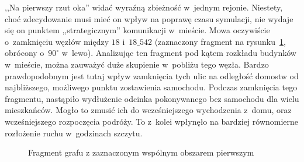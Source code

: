 \documentclass[twoside,12pt]{report}
\begin{document}
,,Na pierwszy rzut oka'' widać wyraźną zbieżność w~jednym rejonie. Niestety, choć zdecydowanie musi mieć on wpływ na poprawę czasu symulacji, nie wydaje się on punktem ,,strategicznym'' komunikacji w~mieście. Mowa oczywiście o~zamknięciu węzłów między $18$ i~$18\_542$ (zaznaczony fragment na rysunku~\ref{fig:frag_1}, obrócony o~$90^{\circ}$ w~lewo). Analizując ten fragment pod kątem rozkładu budynków w~mieście, można zauważyć duże skupienie w~pobliżu tego węzła. Bardzo prawdopodobnym jest tutaj wpływ zamknięcia tych ulic na odległość domostw od najbliższego, możliwego punktu zostawienia samochodu. Podczas zamknięcia tego fragmentu, nastąpiło wydłużenie odcinka pokonywanego bez samochodu dla wielu mieszkańców. Mogło to zmusić ich do wcześniejszego wychodzenia z~domu, oraz wcześniejszego rozpoczęcia podróży. To z~kolei wpłynęło na bardziej równomierne rozłożenie ruchu w~godzinach szczytu.

\begin{figure}[htbp]
\centering
{}
\caption{Fragment grafu z zaznaczonym wspólnym obszarem pierwszym}
\label{fig:frag_1}
\end{figure}
\end{document}
